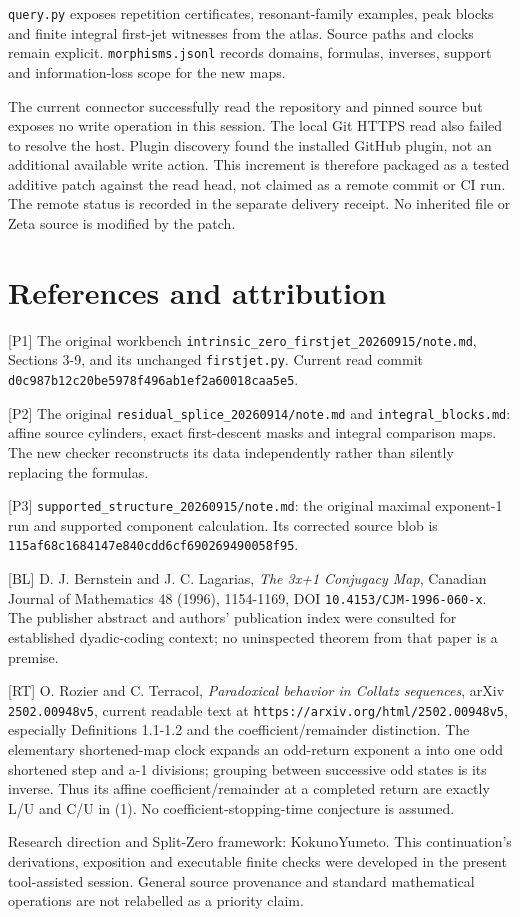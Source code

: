 \nolinkurl{query.py} exposes repetition certificates, resonant-family
examples, peak blocks and finite integral first-jet witnesses from the
atlas. Source paths and clocks remain explicit.
\nolinkurl{morphisms.jsonl} records domains, formulas, inverses, support
and information-loss scope for the new maps.

The current connector successfully read the repository and pinned source
but exposes no write operation in this session. The local Git HTTPS read
also failed to resolve the host. Plugin discovery found the installed
GitHub plugin, not an additional available write action. This increment
is therefore packaged as a tested additive patch against the read head,
not claimed as a remote commit or CI run. The remote status is recorded
in the separate delivery receipt. No inherited file or Zeta source is
modified by the patch.

\section{References and attribution}

{[}P1{]} The original workbench
\nolinkurl{intrinsic_zero_firstjet_20260915/note.md}, Sections 3-9, and
its unchanged \nolinkurl{firstjet.py}. Current read commit
\nolinkurl{d0c987b12c20be5978f496ab1ef2a60018caa5e5}.

{[}P2{]} The original \nolinkurl{residual_splice_20260914/note.md} and
\nolinkurl{integral_blocks.md}: affine source cylinders, exact
first-descent masks and integral comparison maps. The new checker
reconstructs its data independently rather than silently replacing the
formulas.

{[}P3{]} \nolinkurl{supported_structure_20260915/note.md}: the original
maximal exponent-1 run and supported component calculation. Its
corrected source blob is
\nolinkurl{115af68c1684147e840cdd6cf690269490058f95}.

{[}BL{]} D. J. Bernstein and J. C. Lagarias, \emph{The 3x+1 Conjugacy
Map}, Canadian Journal of Mathematics 48 (1996), 1154-1169, DOI
\nolinkurl{10.4153/CJM-1996-060-x}. The publisher abstract and authors'
publication index were consulted for established dyadic-coding context;
no uninspected theorem from that paper is a premise.

{[}RT{]} O. Rozier and C. Terracol, \emph{Paradoxical behavior in
Collatz sequences}, arXiv \nolinkurl{2502.00948v5}, current readable
text at \nolinkurl{https://arxiv.org/html/2502.00948v5}, especially
Definitions 1.1-1.2 and the coefficient/remainder distinction. The
elementary shortened-map clock expands an odd-return exponent a into one
odd shortened step and a-1 divisions; grouping between successive odd
states is its inverse. Thus its affine coefficient/remainder at a
completed return are exactly L/U and C/U in (1). No
coefficient-stopping-time conjecture is assumed.

Research direction and Split-Zero framework: KokunoYumeto. This
continuation's derivations, exposition and executable finite checks were
developed in the present tool-assisted session. General source
provenance and standard mathematical operations are not relabelled as a
priority claim.
